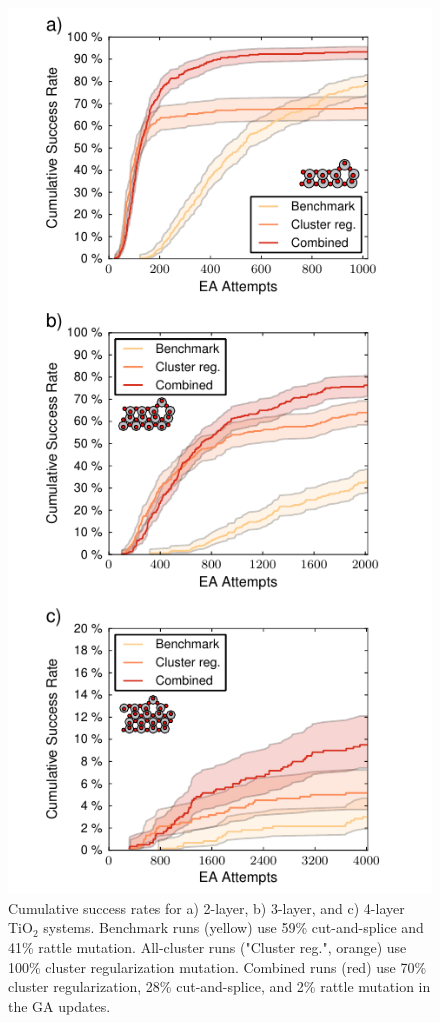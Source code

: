 \documentclass[aip,amsmath,amssymb,reprint]{revtex4-1}
\begin{document}
\begin{figure}[!hb]
    \centering
    \includegraphics[width=1.0\columnwidth]{fig7-success.pdf}
    \caption{Cumulative success rates for a) 2-layer, b) 3-layer, and c) 4-layer TiO$_2$ systems. Benchmark runs (yellow) use 59\% cut-and-splice and
41\% rattle mutation. All-cluster runs ("Cluster reg.", orange) use 100\% cluster
regularization mutation. Combined runs (red) use 70\% cluster regularization, 28\% cut-and-splice, and 2\%
rattle mutation in the GA updates.}
    \label{fig_success}
\end{figure}
\end{document}

